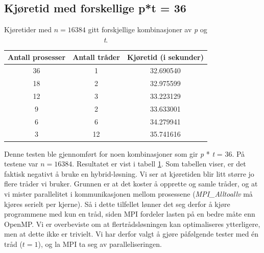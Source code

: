 \documentclass{article}
\begin{document}
\subsection{Kjøretid med forskellige p*t = 36}
\label{subsection:runtime}
\begin{table}
\begin{center}
	
	\begin{tabular}{c | c | c}
	\hline \hline 
	Antall prosesser      &    Antall tråder     &    Kjøretid (i sekunder) 	    \\ \hline	
	36		      &		1	     &	  32.690540       		    \\ \hline
	18		      &         2	     &    32.975599       		    \\ \hline
	12		      &         3	     &    33.223129	    		    \\ \hline
	9   		      &		2	     &    33.633001	    		    \\ \hline
	6		      &         6	     &    34.279941	    		    \\ \hline
	3		      &		12	     &    35.741616	    		    \\ \hline
	
	\end{tabular}
\end{center}
\caption{Kjøretider med $n = 16384$ gitt forskjellige kombinasjoner av \emph{p} og \emph{t}.}
\label{p/t-table}
\end{table}

Denne testen ble gjennomført for noen kombinasjoner som gir \emph{p} * \emph{t} = 36. På testene var $n = 16384$. Resultatet er vist i tabell \ref{p/t-table}. Som tabellen viser, er det faktisk negativt å bruke en hybrid-løsning. Vi ser at kjøretiden blir litt større jo flere tråder vi bruker. Grunnen er at det koster å opprette og samle tråder, og at vi mister parallelitet i kommunikasjonen mellom prosessene (\emph{MPI\_Alltoallv} må kjøres serielt per kjerne). Så i dette tilfellet lønner det seg derfor å kjøre programmene med kun en tråd, siden MPI fordeler lasten på en bedre måte enn OpenMP. Vi er overbeviste om at flertrådsløsningen kan optimaliseres ytterligere, men at dette ikke er trivielt. Vi har derfor valgt å gjøre påfølgende tester med én tråd ($t=1$), og la MPI ta seg av paralleliseringen.
\end{document}
